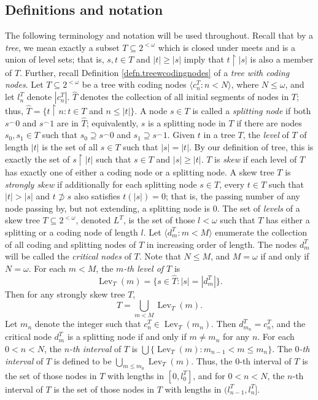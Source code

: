 \documentclass{amsart}
\theoremstyle{remark}
\theoremstyle{definition}
\theoremstyle{remark}
\newcommand{\om}{\omega}
\newcommand{\sse}{\subseteq}
\newcommand{\contains}{\supseteq}
\DeclareMathOperator{\Lev}{Lev}
\newcommand{\re}{\restriction}
\newcommand{\lgl}{\langle}
\newcommand{\rgl}{\rangle}
\begin{document}

\subsection{Definitions and notation}\label{subsection.4.1}


The following terminology and notation will be used throughout.
Recall that
by a  {\em tree}, we mean exactly a subset $T\sse 2^{<\om}$ which is closed under meets and is a union of level sets; that is, $s,t\in T$ and $|t|\ge |s|$ imply that $t\re |s|$ is also a member of $T$.
Further, recall Definition
\ref{defn.treewcodingnodes} of a
 {\em tree with coding nodes}.
Let  $T\sse 2^{<\om}$  be a tree with coding nodes $\lgl c^T_n:n<N\rgl$, where $N\le \om$,
and let
  $l^T_n$ denote $|c^T_n|$.
$\widehat{T}$ denotes the collection of all initial segments of nodes in $T$; thus,
$\widehat{T}=\{t \re n:t\in T$ and $n\le |t|\}$.
A node $s\in T$  is called  a {\em splitting node}  if both $s^{\frown}0$ and $s^{\frown}1$  are in $\widehat{T}$;
equivalently,  $s$ is a splitting node in $T$ if there are nodes $s_0,s_1\in T$ such that
$s_0\contains s^{\frown}0$ and $s_1\contains s^{\frown}1$.
Given $t$ in a tree  $T$, the  {\em level} of  $T$ of length  $|t|$  is  the set of all $s\in T$ such that $|s|=|t|$.
By our definition of tree,
this is exactly the set of $s\re|t|$ such that $s\in T$ and $|s|\ge |t|$.
 $T$   is {\em skew} if
each level of $T$ has exactly one of either a  coding node or a splitting node.
A skew tree
$T$ is {\em strongly skew} if  additionally
for each splitting node $s\in T$,
every
 $t\in T$ such that $|t|>|s|$ and  $t\not\supset s$ also
satisfies
$t(|s|)=0$;
that is, the passing number  of any node  passing by, but not extending, a splitting node
is $0$.
The set of {\em levels} of a skew tree $T\sse 2^{<\om}$, denoted $L^T$, is the set  of those $l<\om$ such that $T$ has either a splitting or a coding node
of length $l$.
Let $\lgl d^T_m:m<M\rgl$  enumerate the collection of all  coding  and splitting nodes of $T$ in increasing order of length.
The  nodes $d^T_m$ will be called the {\em critical nodes} of $T$.
Note that $N\le M$, and $M=\om$ if and only if $N=\om$.
For each $m<M$,
the {\em $m$-th level of $T$} is
\begin{equation}
\Lev_T(m)=\{s\in \widehat{T}:|s|=|d^T_m|\}.
\end{equation}
Then for any strongly skew tree $T$,
\begin{equation}
T=\bigcup_{m<M}\Lev_T(m).
 \end{equation}
Let $m_n$ denote the integer
such that $c^T_n\in \Lev_T(m_n)$.
Then $d^T_{m_n}=c^T_n$,
and the critical node
$d^T_m$ is a splitting node if and only if
 $m\ne m_n$ for any $n$.
For each $0<n<N$,
the {\em $n$-th interval} of $T$
is $\bigcup\{\Lev_T(m):  m_{n-1}<m\le m_n\}$.
 The {\em $0$-th interval} of $T$  is  defined to be $\bigcup_{m\le m_0}\Lev_T(m)$.
Thus, the $0$-th interval of $T$ is the set of those nodes in $T$ with lengths in $[0,l^T_0]$, and for $0<n<N$, the $n$-th interval of $T$ is the set of those nodes in  $T$ with lengths in $(l^T_{n-1},l^T_n]$.
\end{document}
